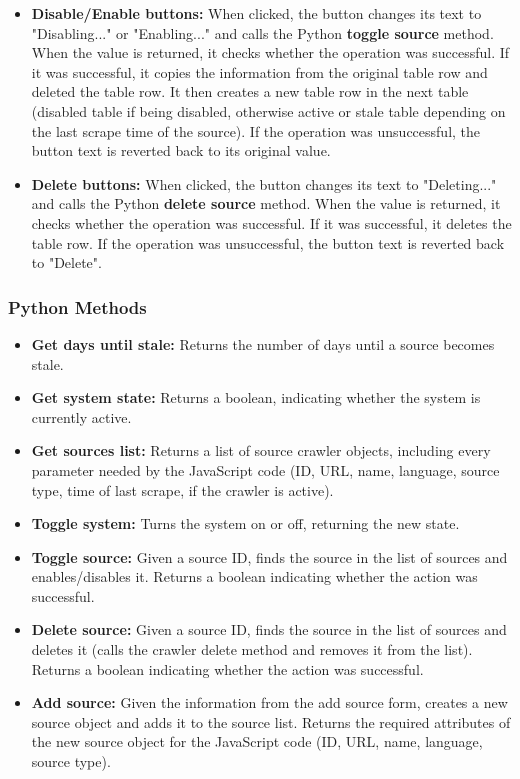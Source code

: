 \documentclass{l4proj}
\begin{document}
\begin{itemize}
    \item \textbf{Disable/Enable buttons: } When clicked, the button changes its text to "Disabling..." or "Enabling..." and calls the Python \textbf{toggle source} method. When the value is returned, it checks whether the operation was successful. If it was successful, it copies the information from the original table row and deleted the table row. It then creates a new table row in the next table (disabled table if being disabled, otherwise active or stale table depending on the last scrape time of the source). If the operation was unsuccessful, the button text is reverted back to its original value.
    \item \textbf{Delete buttons: } When clicked, the button changes its text to "Deleting..." and calls the Python \textbf{delete source} method. When the value is returned, it checks whether the operation was successful. If it was successful, it deletes the table row. If the operation was unsuccessful, the button text is reverted back to "Delete".
\end{itemize}
\hfill \par
\subsubsection{Python Methods}
\begin{itemize}
    \item \textbf{Get days until stale: } Returns the number of days until a source becomes stale.
    \item \textbf{Get system state: } Returns a boolean, indicating whether the system is currently active.
    \item \textbf{Get sources list: } Returns a list of source crawler objects, including every parameter needed by the JavaScript code (ID, URL, name, language, source type, time of last scrape, if the crawler is active).
    \item \textbf{Toggle system: } Turns the system on or off, returning the new state.
    \item \textbf{Toggle source: } Given a source ID, finds the source in the list of sources and enables/disables it. Returns a boolean indicating whether the action was successful.
    \item \textbf{Delete source: } Given a source ID, finds the source in the list of sources and deletes it (calls the crawler delete method and removes it from the list). Returns a boolean indicating whether the action was successful.
    \item \textbf{Add source: } Given the information from the add source form, creates a new source object and adds it to the source list. Returns the required attributes of the new source object for the JavaScript code (ID, URL, name, language, source type).
\end{itemize}
\end{document}
